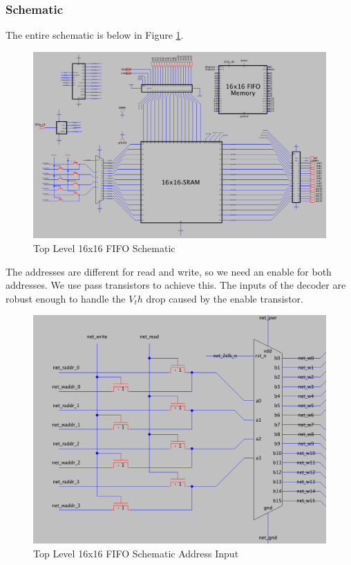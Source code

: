 \documentclass[a4paper]{article}
\begin{document}
\subsubsection{Schematic}
The entire schematic is below in Figure \ref{fig:topLevelSchematic}.

\begin{figure}[H]
	\centering
	\includegraphics[scale=0.3]{topLevelSchematic}
	\caption{Top Level 16x16 FIFO Schematic}
	\label{fig:topLevelSchematic}
\end{figure}

The addresses are different for read and write, so we need an enable for both addresses. We use pass transistors to achieve this. The inputs of the decoder are robust enough to handle the $V_th$ drop caused by the enable transistor.

\begin{figure}[H]
	\centering
	\includegraphics[scale=0.3]{topLevelSchematicLeft}
	\caption{Top Level 16x16 FIFO Schematic Address Input}
	\label{fig:topLevelSchematicLeft}
\end{figure}
\end{document}
